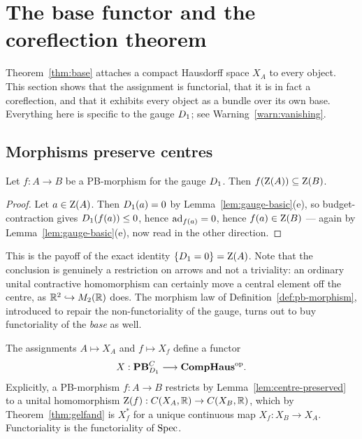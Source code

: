 \section{The base functor and the coreflection theorem}
\label{sec:base}

Theorem~\ref{thm:base} attaches a compact Hausdorff space $X_A$ to every object.
This section shows that the assignment is functorial, that it is in fact a
coreflection, and that it exhibits every object as a bundle over its own base.
Everything here is specific to the gauge $D_1$; see
Warning~\ref{warn:vanishing}.

\subsection{Morphisms preserve centres}

\begin{lemma}\label{lem:centre-preserved}
Let $f:A\to B$ be a PB-morphism for the gauge $D_1$.  Then
$f(\operatorname{Z}(A))\subseteq\operatorname{Z}(B)$.
\end{lemma}

\begin{proof}
Let $a\in\operatorname{Z}(A)$.  Then $D_1(a)=0$ by Lemma~\ref{lem:gauge-basic}(e), so
budget-contraction gives $D_1(f(a))\le0$, hence $\operatorname{ad}_{f(a)}=0$, hence
$f(a)\in\operatorname{Z}(B)$ --- again by Lemma~\ref{lem:gauge-basic}(e), now read in the
other direction.
\end{proof}

\begin{remark}
This is the payoff of the exact identity $\{D_1=0\}=\operatorname{Z}(A)$.  Note that
the conclusion is genuinely a restriction on arrows and not a triviality: an
ordinary unital contractive homomorphism can certainly move a central element
off the centre, as $\mathbb{R}^2\hookrightarrow M_2(\mathbb{R})$ does.  The morphism law of
Definition~\ref{def:pb-morphism}, introduced to repair the non-functoriality of
the gauge, turns out to buy functoriality of the \emph{base} as well.
\end{remark}

\begin{theorem}\label{thm:base-functor}
The assignments $A\mapsto X_A$ and $f\mapsto X_f$ define a functor
\[
  X:\mathbf{PB}^C_{D_1}\longrightarrow\mathbf{CompHaus}^{\mathrm{op}} .
\]
Explicitly, a PB-morphism $f:A\to B$ restricts by
Lemma~\ref{lem:centre-preserved} to a unital homomorphism
$\operatorname{Z}(f):C(X_A,\mathbb{R})\to C(X_B,\mathbb{R})$, which by Theorem~\ref{thm:gelfand} is
$X_f^*$ for a unique continuous map $X_f:X_B\to X_A$.  Functoriality is the
functoriality of $\operatorname{Spec}$.
\end{theorem}

